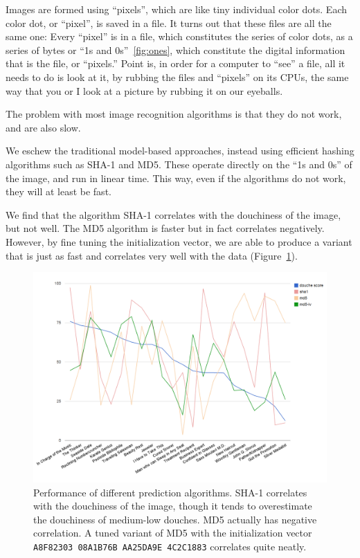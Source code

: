 \documentclass{article} %
\begin{document}
Images are formed using ``pixels'', which are like tiny individual
color dots. Each color dot, or ``pixel'', is saved in a file. It turns
out that these files are all the same one: Every ``pixel'' is in a
file, which constitutes the series of color dots, as a series of bytes
or ``1s and 0s''~\ref{fig:ones}, which constitute the digital
information that is the file, or ``pixels.'' Point is, in order for a
computer to ``see'' a file, all it needs to do is look at it, by
rubbing the files and ``pixels'' on its CPUs, the same way that you or
I look at a picture by rubbing it on our eyeballs.

The problem with most image recognition algorithms is that they do not
work, and are also slow.

We eschew the traditional model-based approaches, instead using efficient
hashing algorithms such as SHA-1 and MD5. These operate directly on
the ``1s and 0s'' of the image, and run in linear time. This way, even
if the algorithms do not work, they will at least be fast.

We find that the algorithm SHA-1 correlates with the douchiness of the
image, but not well. The MD5 algorithm is faster but in fact correlates
negatively. However, by fine tuning the initialization vector, we are
able to produce a variant that is just as fast and correlates very well
with the data (Figure~\ref{fig:chart}).

\begin{figure}
\begin{center}
\includegraphics[width=0.9 \linewidth]{chart}
\end{center}\vspace{-0.1in}
\caption{Performance of different prediction algorithms. SHA-1
  correlates with the douchiness of the image, though it tends to
  overestimate the douchiness of medium-low douches. MD5 actually
  has negative correlation. A tuned variant of MD5 with the
  initialization vector {\tt A8F82303 08A1B76B AA25DA9E 4C2C1883}
  correlates quite neatly.}
\label{fig:chart}
\end{figure}
\end{document}
